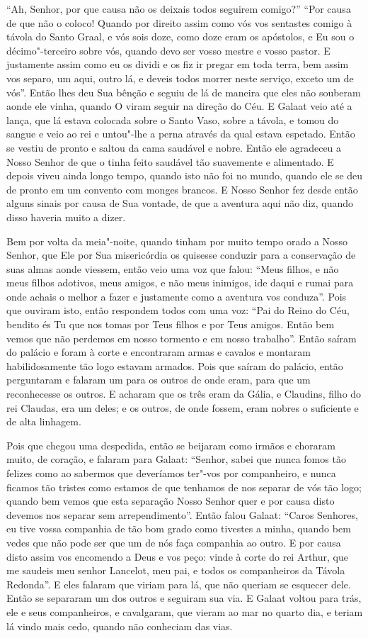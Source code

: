 “Ah, Senhor, por que causa não os deixais todos seguirem comigo?” “Por causa de
que não o coloco! Quando por direito assim como vós vos sentastes comigo à
távola do Santo Graal, e vós sois doze, como doze eram os apóstolos, e Eu sou o
décimo"-terceiro sobre vós, quando devo ser vosso mestre e vosso pastor. E
justamente assim como eu os dividi e os fiz ir pregar em toda terra, bem assim
vos separo, um aqui, outro lá, e deveis todos morrer neste serviço, exceto um
de vós”. Então lhes deu Sua bênção e seguiu de lá de maneira que eles não
souberam aonde ele vinha, quando O viram seguir na direção do Céu. E Galaat 
veio até a lança, que lá estava colocada sobre o Santo Vaso,
sobre a távola, e tomou do sangue e veio ao rei e untou"-lhe a perna através da
qual estava espetado. Então se vestiu de pronto e saltou da cama saudável e
nobre. Então ele agradeceu a Nosso Senhor de que o tinha feito saudável tão
suavemente e alimentado. E depois viveu ainda longo tempo, quando isto não foi
no mundo, quando ele se deu de pronto em um convento com monges brancos. E
Nosso Senhor fez desde então alguns sinais por causa de Sua vontade, de que a
aventura aqui não diz, quando disso haveria muito a dizer. 

Bem por volta da meia"-noite, quando tinham por muito tempo orado a Nosso Senhor,
que Ele por Sua misericórdia os quisesse conduzir para a conservação de suas
almas aonde viessem, então veio uma voz que falou: “Meus filhos, e não meus
filhos adotivos, meus amigos, e não meus inimigos, ide daqui e rumai para onde
achais o melhor a fazer e justamente como a aventura vos conduza”.
Pois que ouviram isto, então respondem todos com uma voz: “Pai do Reino do Céu,
bendito és Tu que nos tomas por Teus filhos e por Teus amigos. Então bem vemos
que não perdemos em nosso tormento e em nosso trabalho”. Então saíram do
palácio e foram à corte e encontraram armas e cavalos e montaram
habilidosamente tão logo estavam armados. Pois que saíram do palácio, então
perguntaram e falaram um para os outros de onde eram, para que um reconhecesse
os outros. E acharam que os três eram da Gália, e Claudins, filho do rei
Claudas, era um deles; e os outros, de onde fossem, eram nobres o suficiente e
de alta linhagem.

Pois que chegou uma despedida, então se beijaram como irmãos e choraram muito,
de coração, e falaram para Galaat: “Senhor, sabei que nunca fomos tão felizes
como ao sabermos que deveríamos ter"-vos por companheiro, e nunca ficamos tão
tristes como estamos de que tenhamos de nos separar de vós tão logo; quando bem
vemos que esta separação Nosso Senhor quer e por causa disto devemos nos
separar sem arrependimento”. Então falou Galaat: “Caros Senhores, eu tive
vossa companhia de tão bom grado como tivestes a minha, quando bem vedes que
não pode ser que um de nós faça companhia ao outro. E por causa disto assim vos
encomendo a Deus e vos peço: vinde à corte do rei Arthur, que me saudeis meu
senhor Lancelot, meu pai, e todos os companheiros da Távola Redonda”. E eles
falaram que viriam para lá, que não queriam se esquecer dele. Então se
separaram um dos outros e seguiram sua via. E Galaat voltou para trás, ele e
seus companheiros, e cavalgaram, que vieram ao mar no quarto dia, e teriam lá
vindo mais cedo, quando não conheciam das vias.

